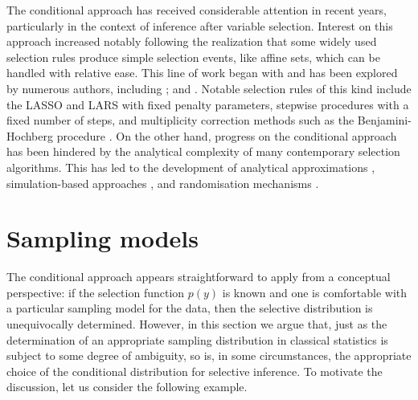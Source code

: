 \documentclass[pdflatex,sn-chicago]{sn-jnl}%
\theoremstyle{thmstyleone}%
\theoremstyle{thmstyletwo}%
\theoremstyle{thmstylethree}%
\begin{document}
The conditional approach has received considerable attention in recent years, particularly in the context of inference after variable selection. Interest on this approach increased notably following the realization that some widely used selection rules produce simple selection events, like affine sets, which can be handled with relative ease. This line of work began with \cite{lockhartetal} and has been explored by numerous authors, including \cite{leetaylor, loftustaylor, leeetal, fithianetal, tibsetalboots}; and \cite{panigrahi-integrative}. Notable selection rules of this kind include the LASSO and LARS with fixed penalty parameters, stepwise procedures with a fixed number of steps, and multiplicity correction methods such as the Benjamini-Hochberg procedure \citep{BH}. On the other hand, progress on the conditional approach has been hindered by the analytical complexity of many contemporary selection algorithms. This has led to the development of analytical approximations \citep{panigrahi-scalable}, simulation-based approaches \citep{blackbox}, and randomisation mechanisms \citep{tian, splitting, leiner, witten-thinning}. 

\section{Sampling models} \label{SEC: sampling}

The conditional approach appears straightforward to apply from a conceptual perspective: if the selection function $p(y)$ is known and one is comfortable with a particular sampling model for the data, then the selective distribution is unequivocally determined. However, in this section we argue that, just as the determination of an appropriate sampling distribution in classical statistics is subject to some degree of ambiguity, so is, in some circumstances, the appropriate choice of the conditional distribution for selective inference. To motivate the discussion, let us consider the following example.
\end{document}
